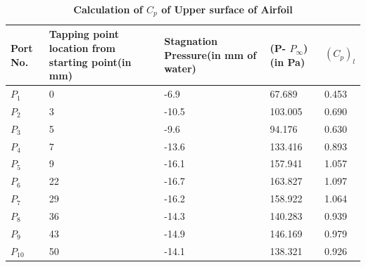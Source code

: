 \documentclass[12pt,a4paper]{article}
\begin{document}
\begin{table}[ht]
\centering
\caption{\textbf{Calculation of $C_p$ of Upper surface of Airfoil}}
\vspace{2mm}

\begin{tabular}{|p{10mm}|p{20mm}|p{20mm}|p{20mm}|p{20mm}|} 
 \hline
Port No. & Tapping point location from starting point(in mm) & Stagnation Pressure(in mm of water) & (P- $P_{\infty}$)(in Pa) &  $(C_p)_l$ \\  
 \hline
$P_1$ & 0 & -6.9  & 67.689 & 0.453 \\ 
 \hline
$P_2$ & 3 & -10.5 & 103.005 & 0.690 \\
 \hline
$P_3$ & 5 & -9.6 & 94.176 & 0.630 \\
 \hline
 $P_4$ & 7 & -13.6 & 133.416 & 0.893 \\
 \hline
$P_5$ & 9 & -16.1 & 157.941 & 1.057 \\
 \hline
$P_6$ & 22 & -16.7 & 163.827 & 1.097 \\ 
 \hline
$P_7$ & 29 & -16.2 & 158.922 & 1.064 \\ 
 \hline
$P_8$ & 36 & -14.3 & 140.283 & 0.939 \\
 \hline
$P_9$ & 43 & -14.9 & 146.169 & 0.979 \\
 \hline
$P_{10}$ & 50 & -14.1 & 138.321 & 0.926 \\ 
 \hline 

\end{tabular}

\end{table}











\newpage
\end{document}
